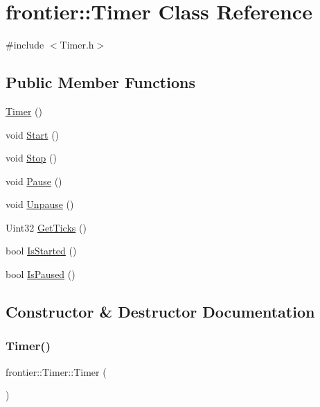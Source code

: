 \hypertarget{classfrontier_1_1_timer}{}\section{frontier\+:\+:Timer Class Reference}
\label{classfrontier_1_1_timer}


{\ttfamily \#include $<$Timer.\+h$>$}

\subsection*{Public Member Functions}
\begin{DoxyCompactItemize}
\item 
\hyperlink{classfrontier_1_1_timer_a6aac1ba4a567320f54e8eee841e9c43b}{Timer} ()
\item 
void \hyperlink{classfrontier_1_1_timer_a26c5d9aeddfcb91bea46d7f14b35e923}{Start} ()
\item 
void \hyperlink{classfrontier_1_1_timer_a878f61e350e7bb28350964f105192533}{Stop} ()
\item 
void \hyperlink{classfrontier_1_1_timer_a9d4c0d3d515cea7b5784ca7488b01d79}{Pause} ()
\item 
void \hyperlink{classfrontier_1_1_timer_a18d0b8d623b50b64fb0893cd9dec56ce}{Unpause} ()
\item 
Uint32 \hyperlink{classfrontier_1_1_timer_ac34abf0e1fada4f0b1f97087c6b6747f}{Get\+Ticks} ()
\item 
bool \hyperlink{classfrontier_1_1_timer_a955bac73463eb53813b84c945f0b9327}{Is\+Started} ()
\item 
bool \hyperlink{classfrontier_1_1_timer_ab1436c1f41e9226977fc8500b6fe3b41}{Is\+Paused} ()
\end{DoxyCompactItemize}


\subsection{Constructor \& Destructor Documentation}
\mbox{\label{classfrontier_1_1_timer_a6aac1ba4a567320f54e8eee841e9c43b}} 
\subsubsection{\texorpdfstring{Timer()}{Timer()}}
{\footnotesize\ttfamily frontier\+::\+Timer\+::\+Timer (\begin{DoxyParamCaption}{ }\end{DoxyParamCaption})}



